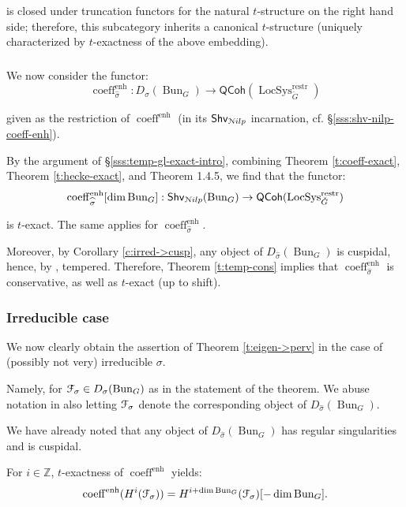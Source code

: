\documentclass[reqno,11pt]{amsart}
\numberwithin{equation}{subsection}
\theoremstyle{remark}
\newcommand{\bZ}{{\mathbb Z}}
\newcommand{\sF}{{\EuScript F}}
\newcommand{\sN}{{\EuScript N}}
\newcommand{\on}{\operatorname}
\newcommand{\Bun}{\on{Bun}}
\newcommand{\LocSys}{\on{LocSys}}
\newcommand{\QCoh}{\mathsf{QCoh}}
\newcommand{\coeff}{\on{coeff}}
\newcommand{\enh}{\on{enh}}
\newcommand{\Shv}{\mathsf{Shv}}
\newcommand{\Nilp}{\sN ilp}
\begin{document}
\noindent is closed under truncation functors for the natural $t$-structure
on the right hand side; therefore, this subcategory inherits a canonical $t$-structure
(uniquely characterized by $t$-exactness of the above embedding).

\subsubsection{}

We now consider the functor:
%
\[
\coeff_{\widehat{\sigma}}^{\enh}:D_{\widehat{\sigma}}(\Bun_G) \to 
\QCoh(\LocSys_{\check{G}}^{\on{restr}})
\]

\noindent given as the restriction of $\coeff^{\enh}$
(in its $\Shv_{\Nilp}$ incarnation, cf. \S \ref{sss:shv-nilp-coeff-enh}).

By the argument of \S \ref{sss:temp-gl-exact-intro}, combining
Theorem \ref{t:coeff-exact}, Theorem \ref{t:hecke-exact}, and 
\cite{agkrrv1} Theorem 1.4.5, we find that
the functor: 
%
\[
\coeff_{\widehat{\sigma}}^{\enh}[\dim \Bun_G]:\Shv_{\Nilp}(\Bun_G) \to 
\QCoh(\LocSys_{\check{G}}^{\on{restr}})
\]

\noindent is $t$-exact. The same applies for $\coeff_{\widehat{\sigma}}^{\enh}$.

Moreover, by Corollary \ref{c:irred->cusp}, any object of 
$D_{\widehat{\sigma}}(\Bun_G)$ is cuspidal, hence, by \cite{dario-ramanujan},
tempered. Therefore, Theorem \ref{t:temp-cons} implies that
$\coeff_{\widehat{\sigma}}^{\enh}$ is conservative, as well as $t$-exact
(up to shift).

\subsubsection{Irreducible case}

We now clearly obtain the assertion of Theorem \ref{t:eigen->perv} in
the case of (possibly not very) irreducible $\sigma$.

Namely, for $\sF_{\sigma} \in D_{\sigma}(\Bun_G)$ as in the statement of the 
theorem. We abuse notation in also letting $\sF_{\sigma}$ denote
the corresponding object of $D_{\widehat{\sigma}}(\Bun_G)$. 

We have already noted that any object of $D_{\widehat{\sigma}}(\Bun_G)$
has regular singularities and is cuspidal.

For $i \in \bZ$, $t$-exactness of $\coeff^{\enh}$ yields:
%
\[
\coeff^{\enh}(H^i(\sF_{\sigma})) = 
H^{i+\dim \Bun_G}(\sF_{\sigma})[-\dim \Bun_G].
\]
\end{document}
